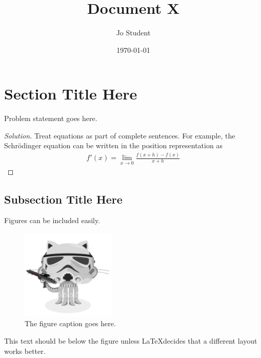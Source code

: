 \documentclass[aps,pra,notitlepage,amsmath,amssymb,letterpaper,12pt]{revtex4-1}
\newenvironment{problem}[2][Problem]{\begin{trivlist}
\item[\hskip \labelsep {\bfseries #1}\hskip \labelsep {\bfseries #2.}]}{\end{trivlist}}
\newenvironment{solution}{\begin{proof}[Solution]}{\end{proof}}
\begin{document}
 
\title{Document X}
\author{Jo Student}
\date{\today}

\maketitle

\section{Section Title Here} %

\begin{problem}{x.yz} 
Problem statement goes here.
\end{problem}
 
\begin{solution} %
Treat equations as part of complete sentences.  For example, the Schr\"odinger equation can be written in the position representation as
\begin{align}
f'(x) = \lim_{x \rightarrow 0} \frac{f(x+h)-f(x)}{x+h}
\end{align}
\end{solution}

\subsection{Subsection Title Here} %

Figures can be included easily.

\begin{figure}[h!] %
  \includegraphics[width=0.4\textwidth]{stormtroopocat.jpg}  %
  \caption{The figure caption goes here.}
  \label{fig:figlabel}
\end{figure}

This text should be below the figure unless \LaTeX  decides that a different layout works better.
 
 
\end{document}

